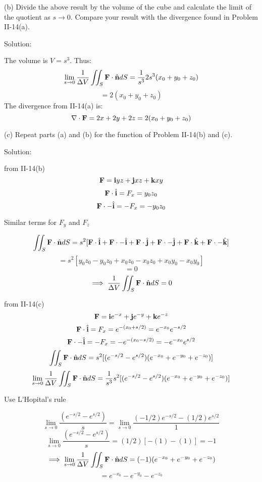 \documentclass{article}
\begin{document}
\begin{enumerate}
    (b) Divide the above result by the volume of the cube and calculate the limit of the quotient
     as $s \rightarrow 0$. Compare your result with the divergence found in Problem II-14(a).

    Solution:

    The volume is $V = s^3$. Thus:
    \[ \lim_{s\to 0} \frac{1}{\Delta V} \iint_S \textbf{F} \cdot \hat{\textbf{n}} dS = \frac{1}{s^3} 2s^3(x_0 + y_0 + z_0) \]
    \[ = 2(x_0 + y_0 + z_0) \]
    The divergence from II-14(a) is:
    \[ \nabla \cdot \textbf{F} = 2x + 2y + 2z = 2(x_0 + y_0 + z_0) \]

    (c) Repeat parts (a) and (b) for the function of Problem II-14(b) and (c).

    Solution:

    from II-14(b)
    \[ \textbf{F} = \textbf{i}{yz} + \textbf{j}{xz} + \textbf{k}{xy} \]
    \[ \textbf{F} \cdot \hat{\textbf{i}} = F_x = y_0 z_0 \]
    \[ \textbf{F} \cdot -\hat{\textbf{i}} = -F_x = -y_0 z_0 \]
    \centerline{Similar terms for $F_y$ and $F_z$}
    \[ \iint_S \textbf{F} \cdot \hat{\textbf{n}} dS = s^2[\textbf{F} \cdot \hat{\textbf{i}} + \textbf{F} \cdot -\hat{\textbf{i}} + \textbf{F} \cdot \hat{\textbf{j}} + \textbf{F} \cdot -\hat{\textbf{j}} + \textbf{F} \cdot \hat{\textbf{k}} + \textbf{F} \cdot -\hat{\textbf{k}}] \]
    \[ = s^2[ y_0 z_0 - y_0 z_0 + x_0 z_0 - x_0 z_0 + x_0 y_0 - x_0 y_0] \]
    \[ = 0 \]
    \[ \implies \frac{1}{\Delta V} \iint_S \textbf{F} \cdot \hat{\textbf{n}} dS = 0 \]

    from II-14(c)
    \[ \textbf{F} = \textbf{i}{e^{-x}} + \textbf{j}{e^{-y}} + \textbf{k}{e^{-z}} \]
    \[ \textbf{F} \cdot \hat{\textbf{i}} = F_x = e^{-(x_0 + s/2)} = e^{-x_0}e^{-s/2} \]
    \[ \textbf{F} \cdot -\hat{\textbf{i}} = -F_x = -e^{-(x_0 - s/2)} = -e^{-x_0}e^{s/2} \]
    \[ \iint_S \textbf{F} \cdot \hat{\textbf{n}} dS = s^2[(e^{-s/2} - e^{s/2})(e^{-x_0} + e^{-y_0} + e^{-z_0})] \]
    \[ \lim_{s\to 0} \frac{1}{\Delta V} \iint_S \textbf{F} \cdot \hat{\textbf{n}} dS = \frac{1}{s^3}s^2[(e^{-s/2} - e^{s/2})(e^{-x_0} + e^{-y_0} + e^{-z_0})] \]
    \centerline{Use L'Hopital's rule}
    \[ \lim_{s\to 0} \frac{(e^{-s/2} - e^{s/2})}{s} = \lim_{s\to 0} \frac{(-1/2)e^{-s/2} - (1/2)e^{s/2}}{1} \]
    \[ \lim_{s\to 0} \frac{(e^{-s/2} - e^{s/2})}{s} = (1/2)[-(1) - (1)] = -1 \]
    \[ \implies \lim_{s\to 0} \frac{1}{\Delta V} \iint_S \textbf{F} \cdot \hat{\textbf{n}} dS = (-1)(e^{-x_0} + e^{-y_0} + e^{-z_0}) \]
    \[ = e^{-x_0} - e^{-y_0} - e^{-z_0} \]
\end{enumerate}
\end{document}
